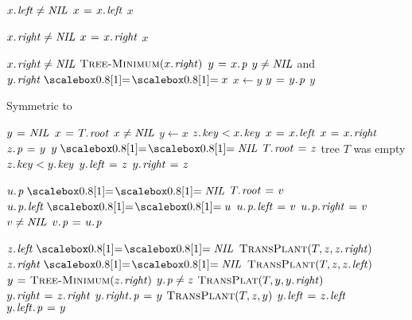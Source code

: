 \documentclass[twocolumn]{article}
\begin{document}
\begin{codebox}
\li \While $\attrib{x}{left} \neq \id{NIL}$
\li \Do $x \gets \attrib{x}{left}$
	\End
\li \Return $x$
\end{codebox}

\begin{codebox}
\li \While $\attrib{x}{right} \neq \id{NIL}$
\li \Do $x \gets \attrib{x}{right}$
	\End
\li \Return $x$
\end{codebox}

\begin{codebox}
\li \While $\attrib{x}{right} \neq \id{NIL}$
\li \Do \Return $\proc{Tree-Minimum}(\attrib{x}{right})$
	\End
\li $y \gets \attrib{x}{p}$
\li \While $y \neq \id{NIL}$ and $\attrib{y}{right} \isequal x$
\li \Do $x \gets y$
\li 		$y \gets \attrib{y}{p}$
	\End
\li \Return $y$
\end{codebox}

\begin{codebox}
\li \Comment Symmetric to 
\end{codebox}

\begin{codebox}
\li $y \gets \id{NIL}$
\li $x \gets \attrib{T}{root}$
\li \While $x \neq \id{NIL}$
\li 		\Do $y \gets x$
\li 		\If $\attrib{z}{key} < \attrib{x}{key}$
\li 		\Then $x \gets \attrib{x}{left}$
\li 		\Else $x \gets \attrib{x}{right}$
		\End
	\End
\li $\attrib{z}{p} \gets y$
\li \If $y \isequal \id{NIL}$
\li \Then $\attrib{T}{root} \gets z$ \>\>\>\Comment tree $T$ was empty
\li \ElseIf $\attrib{z}{key} < \attrib{y}{key}$
\li \Then $\attrib{y}{left} \gets z$
\li \Else $\attrib{y}{right} \gets z$
	\End
\end{codebox}

\begin{codebox}
\li \If $\attrib{u}{p} \isequal \id{NIL}$
\li \Do $\attrib{T}{root} \gets v$
\li \ElseIf $\attribb{u}{p}{left} \isequal u$
\li \Do $\attribb{u}{p}{left} \gets v$
\li \Else $\attribb{u}{p}{right} \gets v$
	\End
\li \If $v \neq \id{NIL}$
\li \Then $\attrib{v}{p} \gets \attrib{u}{p}$
	\End
\end{codebox}

\begin{codebox}
\li \If $\attrib{z}{left} \isequal \id{NIL}$
\li \Then $\proc{TransPlant}(T,z,\attrib{z}{right})$
\li \ElseIf $\attrib{z}{right} \isequal \id{NIL}$
\li \Then $\proc{TransPlant}(T,z,\attrib{z}{left})$
\li \Else $y \gets \proc{Tree-Minimum}(\attrib{z}{right})$
\li 		\If $\attrib{y}{p} \neq z$
\li 		\Then $\proc{TransPlat}(T,y,\attrib{y}{right})$
\li 		$\attrib{y}{right} \gets \attrib{z}{right}$
\li 		$\attribb{y}{right}{p} \gets y$
		\End
\li $\textnormal{\scshape TransPlant}(T,z,y)$
\li $\attrib{y}{left} \gets \attrib{z}{left}$
\li $\attribb{y}{left}{p} \gets y$
	\End
\end{codebox}
\end{document}
